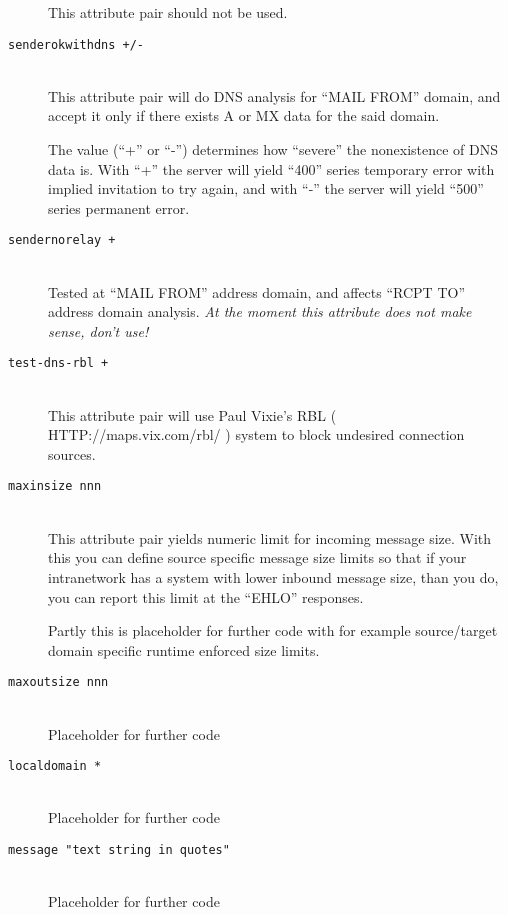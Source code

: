 \begin{description}
This attribute pair should not be used.

\item[\tt senderokwithdns +/-] \mbox{} \\
This attribute pair will do DNS analysis for ``MAIL FROM'' domain, and
accept it only if there exists A or MX data for the said domain.

The value (``+'' or ``-'') determines how ``severe'' the nonexistence
of DNS data is.  With ``+'' the server will yield ``400'' series temporary
error with implied invitation to try again, and with ``-'' the server will
yield ``500'' series permanent error.


\item[\tt sendernorelay +] \mbox{} \\
Tested at ``MAIL FROM'' address domain, and affects ``RCPT TO''
address domain analysis.
{\em At the moment this attribute does not make sense, don't use!}

\item[\tt test-dns-rbl +] \mbox{} \\
This attribute pair will use Paul Vixie's RBL
( HTTP://maps.vix.com/rbl/ )
system to block undesired connection sources.

\item[\tt maxinsize nnn] \mbox{} \\
This attribute pair yields numeric limit for incoming message
size.  With this you can define source specific message size
limits so that if your intranetwork has a system with lower
inbound message size, than you do, you can report this limit
at the ``EHLO'' responses.

Partly this is placeholder for further code with for example
source/target domain specific runtime enforced size limits.

\item[\tt maxoutsize nnn] \mbox{} \\
Placeholder for further code

\item[\tt localdomain *] \mbox{} \\
Placeholder for further code

\item[\tt message "text string in quotes"] \mbox{} \\
Placeholder for further code
\end{description}


